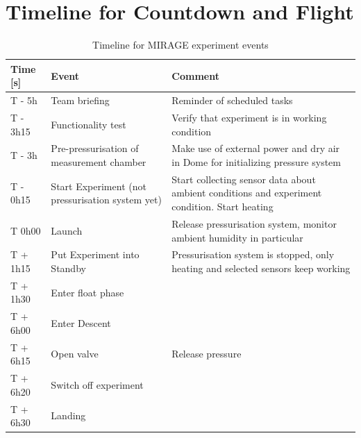 \section{Timeline for Countdown and Flight}
\label{sec:timeline}


\begin{table}[htbp]
\centering
\caption{Timeline for MIRAGE experiment events}
\label{tab:timeline}
\begin{tabular}{p{2cm}p{5cm}p{5cm}}
\toprule
\textbf{Time [s]} & \textbf{Event} & \textbf{Comment} \\
\midrule
T - 5h & Team briefing & Reminder of scheduled tasks \\
T - 3h15 & Functionality test & Verify that experiment is in working condition \\
T - 3h & Pre-pressurisation of measurement chamber & Make use of external power and dry air in Dome for initializing pressure system \\
T - 0h15 & Start Experiment (not pressurisation system yet) & Start collecting sensor data about ambient conditions and experiment condition. Start heating  \\
T 0h00 & Launch & Release pressurisation system, monitor ambient humidity in particular\\
T + 1h15 & Put Experiment into Standby & Pressurisation system is stopped, only heating and selected sensors keep working\\
T + 1h30 & Enter float phase & \\
T + 6h00 & Enter Descent & \\
T + 6h15 & Open valve & Release pressure\\
T + 6h20 & Switch off experiment & \\
T + 6h30 & Landing & \\
\bottomrule
\end{tabular}
\end{table}

